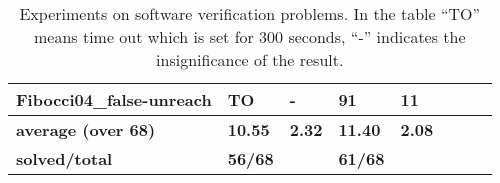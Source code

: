 \begin{table}
{\begin{tabular}{|l|l|l|l|l|l|l|}
    Fibocci04\_false-unreach                                 & TO                                    & -                                          & 91                                    & 11                                         & ~                                                               & ~                                        \\ \hline
    \hline    \textbf{average (over 68)} & \textbf{10.55}             & \textbf{2.32}                   & \textbf{11.40}             & \textbf{2.08}                   & ~                                                               & ~                                        \\ \hline
    \textbf{solved/total}                         & \textbf{56/68}             & ~                                          & \textbf{61/68}             & ~                                          & ~                                                               & ~                                        \\ \hline
    \end{tabular}
   }
   
        \caption{Experiments on  software verification problems. In the table  ``TO'' means  time out which is set for 300 seconds,  ``-'' indicates the insignificance of the result.}
   \label{ch7:tbl:experiments}
\end{table}




